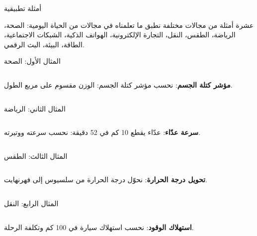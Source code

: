 \begin{frame}{أمثلة تطبيقية}
    \begin{tbox}{\faLaptopCode\quad عشرة أمثلة من مجالات مختلفة}
        نطبق ما تعلمناه في مجالات من الحياة اليومية:
        الصحة، الرياضة، الطقس، النقل، التجارة الإلكترونية، الهواتف الذكية، الشبكات الاجتماعية، الطاقة، البيئة، البث الرقمي.
    \end{tbox}
\end{frame}

\begin{frame}[t]{المثال الأول: الصحة}
    \begin{columns}[T]
        {\small\textbf{مؤشر كتلة الجسم}: نحسب مؤشر كتلة الجسم: الوزن مقسوم على مربع الطول.\par}
        \vspace{0.3cm}
    \end{columns}
\end{frame}

\begin{frame}[t]{المثال الثاني: الرياضة}
    \begin{columns}[T]
        {\small\textbf{سرعة عدّاء}: عدّاء يقطع 10 كم في 52 دقيقة: نحسب سرعته ووتيرته.\par}
        \vspace{0.3cm}
    \end{columns}
\end{frame}

\begin{frame}[t]{المثال الثالث: الطقس}
    \begin{columns}[T]
        {\small\textbf{تحويل درجة الحرارة}: نحوّل درجة الحرارة من سلسيوس إلى فهرنهايت.\par}
        \vspace{0.3cm}
    \end{columns}
\end{frame}

\begin{frame}[t]{المثال الرابع: النقل}
    \begin{columns}[T]
        {\small\textbf{استهلاك الوقود}: نحسب استهلاك سيارة في 100 كم وتكلفة الرحلة.\par}
        \vspace{0.3cm}
    \end{columns}
\end{frame}

